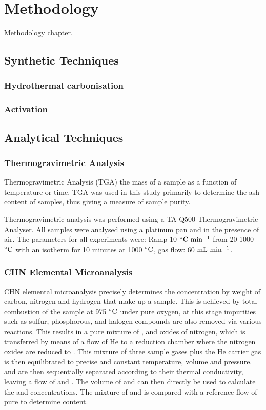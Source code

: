 \chapter{Methodology}
\label{ch:methodology}

Methodology chapter.

\section{Synthetic Techniques}
\subsection{Hydrothermal carbonisation}
\subsection{Activation}

\section{Analytical Techniques}

\subsection{Thermogravimetric Analysis}
Thermogravimetric Analysis (TGA) the mass of a sample as a function of temperature or time.\citep{coats1963thermogravimetric} TGA was used in this study primarily to determine the ash content of samples, thus giving a measure of sample purity.\citep{mcnaught1997compendium}

Thermogravimetric analysis was performed using a TA Q500 Thermogravimetric Analyser. All samples were analysed using a platinum pan and in the presence of air. The parameters for all experiments were: Ramp 10 $\rm ^{\circ}C\ min^{-1}$ from 20-1000 $\rm ^{\circ}C$ with an isotherm for 10 minutes at 1000 $\rm ^{\circ}C$, gas flow: 60 $\rm mL\ min^{-1}$.

\subsection{CHN Elemental Microanalysis}
CHN elemental microanalysis precisely determines the concentration by weight of carbon, nitrogen and hydrogen that make up a sample. This is achieved by total combustion of the sample at 975 $\rm ^{\circ}C$ under pure oxygen, at this stage impurities such as sulfur, phosphorous, and halogen compounds are also removed via various reactions. This results in a pure mixture of ,  and oxides of nitrogen, which is transferred by means of a flow of He to a reduction chamber where the nitrogen oxides are reduced to . This mixture of three sample gases plus the He carrier gas is then equilibrated to precise and constant temperature, volume and pressure.  and  are then sequentially separated according to their thermal conductivity, leaving a flow of  and . The volume of  and  can then directly be used to calculate the  and  concentrations. The mixture of  and  is compared with a reference flow of pure  to determine  content.

